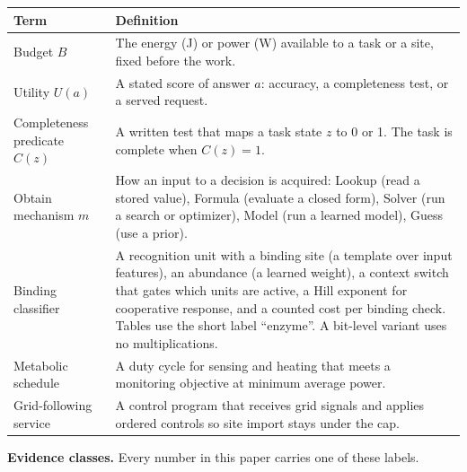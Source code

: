 \documentclass[10pt,letterpaper]{article}
\newcounter{none}
\begin{document}
{\def\LTcaptype{none} %
{\footnotesize\setlength{\tabcolsep}{3.8pt}\renewcommand{\arraystretch}{1.15}
\begin{longtable}[]{@{}
  >{\raggedright\arraybackslash}p{}
  >{\raggedright\arraybackslash}p{}@{}}
\toprule\noalign{}
\begin{minipage}[b]{\linewidth}\raggedright
\textbf{Term}
\end{minipage} & \begin{minipage}[b]{\linewidth}\raggedright
\textbf{Definition}
\end{minipage} \\
\midrule\noalign{}
\endhead
\bottomrule\noalign{}
\endlastfoot
Budget \(B\) & The energy (J) or power (W) available to a task or a
site, fixed before the work. \\
Utility \(U(a)\) & A stated score of answer \(a\): accuracy, a
completeness test, or a served request. \\
Completeness predicate \(C(z)\) & A written test that maps a task state
\(z\) to 0 or 1. The task is complete when \(C(z) = 1\). \\
Obtain mechanism \(m\) & How an input to a decision is acquired: Lookup
(read a stored value), Formula (evaluate a closed form), Solver (run a
search or optimizer), Model (run a learned model), Guess (use a
prior). \\
Binding classifier & A recognition unit with a binding site (a template
over input features), an abundance (a learned weight), a context switch
that gates which units are active, a Hill exponent for cooperative
response, and a counted cost per binding check. Tables use the short
label ``enzyme''. A bit-level variant uses no multiplications. \\
Metabolic schedule & A duty cycle for sensing and heating that meets a
monitoring objective at minimum average power. \\
Grid-following service & A control program that receives grid signals
and applies ordered controls so site import stays under the cap. \\
\end{longtable}
}
}

\textbf{Evidence classes.} Every number in this paper carries one of
these labels.
\end{document}
